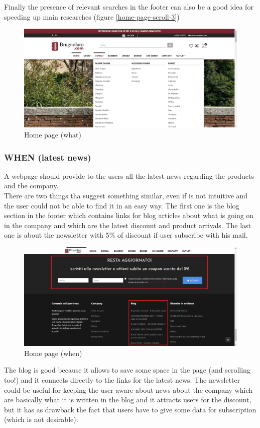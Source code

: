 Finally the presence of relevant searches in the footer can also be a good idea for
speeding up main researches (figure \ref{home-page-scroll-3})
\begin{figure}[!h] 
    \centering 
    \includegraphics[scale = 0.29]{images/what_menu.png} 
    \caption{Home page (what)}
    \label{home-page-what}
\end{figure}
\newpage
\subsubsection{WHEN (latest news)}
A webpage should provide to the users all the latest news regarding the products and the company.\\

There are two things tha suggest something similar, even if is not intuitive and the user
could not be able to find it in an easy way.
The first one is the blog section in the footer which contains links for blog articles about
what is going on in the company and which are the latest discount and product arrivals.
The last one is about the newsletter with 5\% of discount if user subscribe with his mail.
\begin{figure}[!h] 
    \centering 
    \includegraphics[scale = 0.29]{images/when.png} 
    \caption{Home page (when)}
    \label{home-page-when}
\end{figure}
\newline
The blog is good because it allows to save some space in the page (and scrolling too!) and
it connects directly to the links for the latest news.
The newsletter could be useful for keeping the user aware about news about the company which
are basically what it is written in the blog and it attracts users for the discount, but it has
as drawback the fact that users have to give some data for subscription (which is not desirable).

